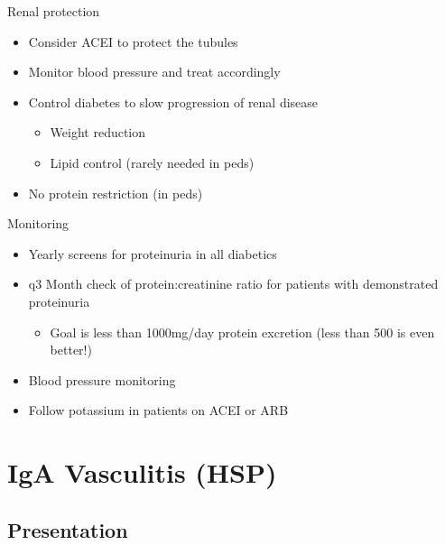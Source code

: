 \begin{frame}{Renal protection}

\begin{itemize}
\itemsep1pt\parskip0pt
\item
  Consider ACEI to protect the tubules
\item
  Monitor blood pressure and treat accordingly
\item
  Control diabetes to slow progression of renal disease

  \begin{itemize}
  \itemsep1pt\parskip0pt
  \item
    Weight reduction
  \item
    Lipid control (rarely needed in peds)
  \end{itemize}
\item
  No protein restriction (in peds)
\end{itemize}

\end{frame}

\begin{frame}{Monitoring}

\begin{itemize}
\itemsep1pt\parskip0pt
\item
  Yearly screens for proteinuria in all diabetics
\item
  q3 Month check of protein:creatinine ratio for patients with
  demonstrated proteinuria

  \begin{itemize}
  \itemsep1pt\parskip0pt
  \item
    Goal is less than 1000mg/day protein excretion (less than 500 is
    even better!)
  \end{itemize}
\item
  Blood pressure monitoring
\item
  Follow potassium in patients on ACEI or ARB
\end{itemize}

\end{frame}

\section{IgA Vasculitis (HSP)}\label{iga-vasculitis-hsp}

\frame{\tableofcontents[hideothersubsections]}

\subsection{Presentation}\label{presentation}

